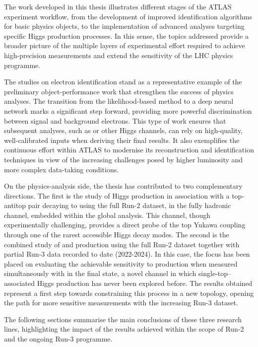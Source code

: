 The work developed in this thesis illustrates different stages of the ATLAS experiment workflow, from the development of improved identification algorithms for basic physics objects, to the implementation of advanced analyses targeting specific Higgs production processes. In this sense, the topics addressed provide a broader picture of the multiple layers of experimental effort required to achieve high-precision measurements and extend the sensitivity of the LHC physics programme.

The studies on electron identification stand as a representative example of the preliminary object-performance work that strengthen the success of physics analyses. The transition from the likelihood-based method to a deep neural network marks a significant step forward, providing more powerful discrimination between signal and background electrons. This type of work ensures that subsequent analyses, such as \htautau or other Higgs channels, can rely on high-quality, well-calibrated inputs when deriving their final results. It also exemplifies the continuous effort within ATLAS to modernise its reconstruction and identification techniques in view of the increasing challenges posed by higher luminosity and more complex data-taking conditions.

On the physics-analysis side, the thesis has contributed to two complementary directions. The first is the study of Higgs production in association with a top-antitop pair decaying to \taul using the full Run-2 dataset, in the fully hadronic channel, embedded within the global \htautau analysis. This channel, though experimentally challenging, provides a direct probe of the top Yukawa coupling through one of the rarest accessible Higgs decay modes. The second is the combined study of \thqb and \ttH production using the full Run-2 dataset together with partial Run-3 data recorded to date (2022-2024). In this case, the focus has been placed on evaluating the achievable sensitivity to \thqb production when measured simultaneously with \tth in the \tauhadhad final state, a novel channel in which single-top–associated Higgs production has never been explored before. The results obtained represent a first step towards constraining this process in a new topology, opening the path for more sensitive measurements with the increasing Run-3 dataset.

The following sections summarise the main conclusions of these three research lines, highlighting the impact of the results achieved within the scope of Run-2 and the ongoing Run-3 programme.

